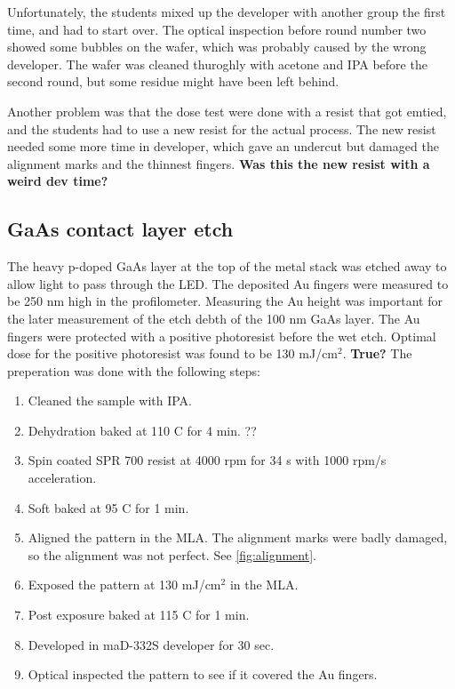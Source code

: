 Unfortunately, the students mixed up the developer with another group the first time, and had to start over.
The optical inspection before round number two showed some bubbles on the wafer, which was probably caused by the wrong developer.
The wafer was cleaned thuroghly with acetone and IPA before the second round, but some residue might have been left behind.

Another problem was that the dose test were done with a resist that got emtied, and the students had to use a new resist for the actual process.
The new resist needed some more time in developer, which gave an undercut but damaged the alignment marks and the thinnest fingers.
\textbf{Was this the new resist with a weird dev time?}




\subsection{GaAs contact layer etch}
\label{methods:wet_etch}
The heavy p-doped GaAs layer at the top of the metal stack was etched away to allow light to pass through the LED.
The deposited Au fingers were measured to be 250 nm high in the profilometer.
Measuring the Au height was important for the later measurement of the etch debth of the 100 nm GaAs layer.
The Au fingers were protected with a positive photoresist before the wet etch.
Optimal dose for the positive photoresist was found to be 130 mJ/cm$^2$. \textbf{True?}
The preperation was done with the following steps:
\begin{enumerate}
    \item Cleaned the sample with IPA.
    \item Dehydration baked at 110 \textdegree C for 4 min. ??
    \item Spin coated SPR 700 resist at 4000 rpm for 34 s with 1000 rpm/s acceleration.
    \item Soft baked at 95 \textdegree C for 1 min.
    \item Aligned the pattern in the MLA. The alignment marks were badly damaged, so the alignment was not perfect. See \autoref{fig:alignment}.
    \item Exposed the pattern at 130 mJ/cm$^2$ in the MLA.
    \item Post exposure baked at 115 \textdegree C for 1 min.
    \item Developed in maD-332S developer for 30 sec.
    \item Optical inspected the pattern to see if it covered the Au fingers.
\end{enumerate}

